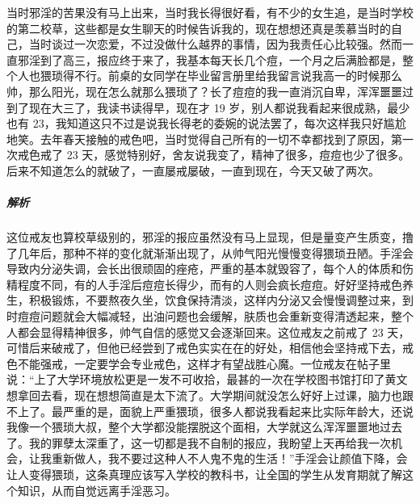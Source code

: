 \begin{case}
    当时邪淫的苦果没有马上出来，当时我长得很好看，有不少的女生追，是当时学校的第二校草，这些都是女生聊天的时候告诉我的，现在想想还真是羡慕当时的自己，当时谈过一次恋爱，不过没做什么越界的事情，因为我责任心比较强。然而一直邪淫到了高三，报应终于来了，我基本每天长几个痘，一个月之后满脸都是，整个人也猥琐得不行。前桌的女同学在毕业留言册里给我留言说我高一的时候那么帅，那么阳光，现在怎么就那么猥琐了？长了痘痘的我一直消沉自卑，浑浑噩噩过到了现在大三了，我读书读得早，现在才 19 岁，别人都说我看起来很成熟，最少也有 23，我知道这只不过是说我长得老的委婉的说法罢了，每次这样我只好尴尬地笑。去年春天接触的戒色吧，当时觉得自己所有的一切不幸都找到了原因，第一次戒色戒了 23 天，感觉特别好，舍友说我变了，精神了很多，痘痘也少了很多。后来不知道怎么的就破了，一直屡戒屡破，一直到现在，今天又破了两次。
    \subparagraph{解析} 这位戒友也算校草级别的，邪淫的报应虽然没有马上显现，但是量变产生质变，撸了几年后，那种不祥的变化就渐渐出现了，从帅气阳光慢慢变得猥琐丑陋。手淫会导致内分泌失调，会长出很顽固的痤疮，严重的基本就毁容了，每个人的体质和伤精程度不同，有的人手淫后痘痘长得少，而有的人则会疯长痘痘。好好坚持戒色养生，积极锻炼，不要熬夜久坐，饮食保持清淡，这样内分泌又会慢慢调整过来，到时痘痘问题就会大幅减轻，出油问题也会缓解，肤质也会重新变得清透起来，整个人都会显得精神很多，帅气自信的感觉又会逐渐回来。这位戒友之前戒了 23 天，可惜后来破戒了，但他已经尝到了戒色实实在在的好处，相信他会坚持戒下去，戒色不能强戒，一定要学会专业戒色，这样才有望战胜心魔。一位戒友在帖子里说：“上了大学环境放松更是一发不可收拾，最甚的一次在学校图书馆打印了黄文想拿回去看，现在想想简直是太下流了。大学期间就没怎么好好上过课，脑力也跟不上了。最严重的是，面貌上严重猥琐，很多人都说我看起来比实际年龄大，还说我像一个猥琐大叔，整个大学都没能摆脱这个面相，大学就这么浑浑噩噩地过去了。我的罪孽太深重了，这一切都是我不自制的报应，我盼望上天再给我一次机会，让我重新做人，我不要过这种人不人鬼不鬼的生活！”手淫会让颜值下降，会让人变得猥琐，这条真理应该写入学校的教科书，让全国的学生从发育期就了解这个知识，从而自觉远离手淫恶习。
\end{case}

